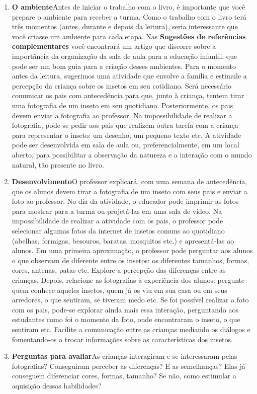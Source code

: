 \documentclass[11pt]{extarticle}
\begin{document}
\begin{enumerate}
\item \textbf{O ambiente}\quad Antes de iniciar o trabalho com o livro, é importante que você prepare o ambiente para receber a turma. Como o trabalho com o livro terá 
três momentos (antes, durante e depois da leitura), seria interessante que você 
criasse um ambiente para cada etapa. Nas \textbf{Sugestões de referências complementares} 
você encontrará um artigo que discorre sobre a importância da organização da sala 
de aula para a educação infantil, que pode ser um bom guia para a criação desses 
ambientes. Para o momento antes da leitura, sugerimos uma atividade que envolve a família e estimule a percepção da criança sobre os insetos em seu cotidiano.
Será necessário comunicar os pais com antecedência para que, junto à criança, tentem tirar uma fotografia de um inseto em seu quotidiano. Posteriormente, os pais devem enviar a fotografia ao professor. Na impossibilidade de realizar a fotografia, pode-se pedir aos pais que realizem outra tarefa com a criança para representar o inseto: um desenho, um pequeno texto etc. A atividade pode ser desenvolvida em sala de aula ou, preferencialmente, em um local aberto, para possibilitar a observação da natureza e a interação com o mundo natural, tão presente no livro.

\item \textbf{Desenvolvimento}\quad O professor explicará, com uma semana de antecedência, que os alunos devem tirar a fotografia de um inseto com seus pais e enviar a foto ao professor. No dia da atividade, o educador pode imprimir as fotos para mostrar para a turma ou projetá-las em uma sala de vídeo. Na impossibilidade de realizar a atividade com os pais, o professor pode selecionar algumas fotos da internet de insetos comuns ao quotidiano (abelhas, formigas, besouros, baratas, mosquitos etc.) e apresentá-las ao alunos.
Em uma primeira aproximação, o professor pode perguntar aos alunos o que observam de diferente entre os insetos: os diferentes tamanhos, formas, cores, antenas, patas etc. Explore a percepção das diferenças entre as crianças.
Depois, relacione as fotografias à experiência dos alunos: pergunte quem conhece aqueles insetos, quem já os viu em sua casa ou em seus arredores, o que sentiram, se tiveram medo etc. Se foi possível realizar a foto com os pais, pode-se explorar ainda mais essa interação, perguntando aos estudantes como foi o momento da foto, onde encontraram o inseto, o que sentiram etc.
Facilite a comunicação entre as crianças mediando os diálogos e fomentando-os a trocar informações sobre as características dos insetos.


\item \textbf{Perguntas para avaliar}\quad As crianças interagiram e se interessaram pelas fotografias? Conseguiram perceber as diferenças? E as semelhanças? Elas já conseguem diferenciar cores, formas, tamanho? Se não, como estimular a aquisição dessas habilidades? 
\end{enumerate}
\end{document}
